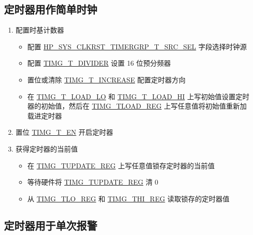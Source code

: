 \documentclass[main\_\_CN.tex]{subfiles}
\begin{document}
\subsection{定时器用作简单时钟}
\label{sec:timg-func-descr-simple-clock}
\begin{enumerate}
    \item 配置时基计数器
        \begin{itemize}
        \item 配置 \hyperref[fielddesc:HPSYSCLKRSTTIMERGRPNTXSRCSEL]{HP\_SYS\_CLKRST\_TIMERGRP\_T\_SRC\_SEL} 字段选择时钟源
        \item 配置 \hyperref[fielddesc:TIMGTXDIVIDER]{TIMG\_T\_DIVIDER} 设置 16 位预分频器
        \item 置位或清除 \hyperref[fielddesc:TIMGTXINCREASE]{TIMG\_T\_INCREASE} 配置定时器方向
        \item 在 \hyperref[fielddesc:TIMGTXLOADLO]{TIMG\_T\_LOAD\_LO} 和 \hyperref[fielddesc:TIMGTXLOADHI]{TIMG\_T\_LOAD\_HI} 上写初始值设置定时器的初始值，然后在 \hyperref[regdesc:TIMGTXLOADREG]{TIMG\_TLOAD\_REG} 上写任意值将初始值重新加载进定时器
    \end{itemize}
    \item 置位 \hyperref[fielddesc:TIMGTXEN]{TIMG\_T\_EN} 开启定时器
    \item 获得定时器的当前值
    \begin{itemize}
        \item 在 \hyperref[regdesc:TIMGTXUPDATEREG]{TIMG\_TUPDATE\_REG} 上写任意值锁存定时器的当前值
        \item 等待硬件将 \hyperref[regdesc:TIMGTXUPDATEREG]{TIMG\_TUPDATE\_REG} 清 0
        \item 从 \hyperref[regdesc:TIMGTXLOREG]{TIMG\_TLO\_REG} 和 \hyperref[regdesc:TIMGTXHIREG]{TIMG\_THI\_REG} 读取锁存的定时器值
    \end{itemize}
\end{enumerate}

\subsection{定时器用于单次报警}
\label{sec:timg-func-descr-timer-alarm}
\end{document}

